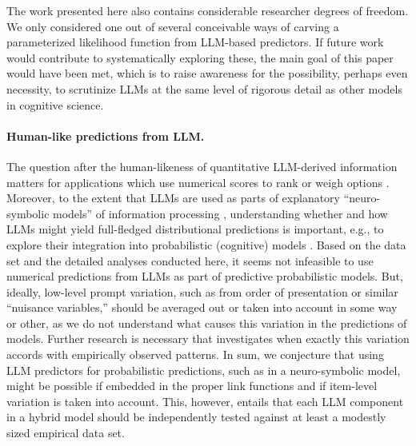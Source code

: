 \documentclass[fleqn]{article}
\begin{document}
The work presented here also contains considerable researcher degrees of freedom.
We only considered one out of several conceivable ways of carving a parameterized likelihood function from LLM-based predictors.
If future work would contribute to systematically exploring these, the main goal of this paper would have been met, which is to raise awareness for the possibility, perhaps even necessity, to scrutinize LLMs at the same level of rigorous detail as other models in cognitive science.

\paragraph{Human-like predictions from LLM.}
The question after the human-likeness of quantitative LLM-derived information matters for applications which use numerical scores to rank or weigh options \citep[e.g.,][]{ParkOBrien2023:Generative-Agen,ZhangLehman2023:OMNI:-Open-ende}.
Moreover, to the extent that LLMs are used as parts of explanatory ``neuro-symbolic models'' of information processing \citep{GarcezLamb2020:Neurosymbolic-A}, understanding whether and how LLMs might yield full-fledged distributional predictions is important, e.g., to explore their integration into probabilistic (cognitive) models \citep[c.f.,][]{LewTessler2020:Leveraging-Unst,WongGrand2023:From-Word-Model,Frank2023:Large-language-}.
Based on the data set and the detailed analyses conducted here, it seems not infeasible to use numerical predictions from LLMs as part of predictive probabilistic models.
But, ideally, low-level prompt variation, such as from order of presentation or similar ``nuisance variables,'' should be averaged out or taken into account in some way or other, as we do not understand what causes this variation in the predictions of models.
Further research is necessary that investigates when exactly this variation accords with empirically observed patterns.
In sum, we conjecture that using LLM predictors for probabilistic predictions, such as in a neuro-symbolic model, might be possible if embedded in the proper link functions and if item-level variation is taken into account.
This, however, entails that each LLM component in a hybrid model should be independently tested against at least a modestly sized empirical data set.
\end{document}
